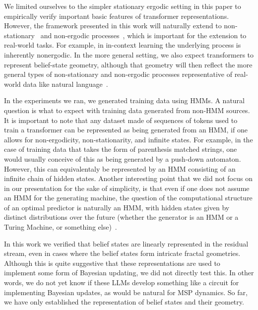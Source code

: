 \documentclass{article}
\begin{document}
We limited ourselves to the simpler stationary ergodic setting in this paper to empirically verify important basic features of transformer representations. However, the framework presented in this work will naturally extend to non-stationary~\cite{riechers2021fraudulent} and non-ergodic processes~\cite{crutchfield2015signatures}, which is important for the extension to real-world tasks. For example, in in-context learning the underlying process is inherently nonergodic.  In the more general setting, we also expect transformers to represent belief-state geometry, although that geometry will then reflect the more general types of non-stationary and non-ergodic processes representative of real-world data like natural language~\cite{debowski2020information, dkebowski2023simplistic}.

In the experiments we ran, we generated training data using HMMs. A natural question is what to expect with training data generated from non-HMM sources. It is important to note that any dataset made of sequences of tokens used to train a transformer can be represented as being generated from an HMM, if one allows for non-ergodicity, non-stationarity, and infinite states. For example, in the case of training data that takes the form of parenthesis matched strings, one would usually conceive of this as being generated by a push-down automaton. However, this can equivalentaly be represented by an HMM consisting of an infinite chain of hidden states. Another interesting point that we did not focus on in our presentation for the sake of simplicity, is that even if one does not assume an HMM for the generating machine, the question of the computational structure of an optimal predictor is naturally an HMM, with hidden states given by distinct distributions over the future (whether the generator is an HMM or a Turing Machine, or something else)~\cite{Uppe97a}.




In this work we verified that belief states are linearly represented in the residual stream, even in cases where the belief states form intricate fractal geometries. Although this is quite suggestive that these representations are used to implement some form of Bayesian updating, we did not directly test this. In other words, we do not yet know if these LLMs develop something like a circuit for implementing Bayesian updates, as would be natural for MSP dynamics. So far, we have only established
the representation of belief states and their geometry.
\end{document}
